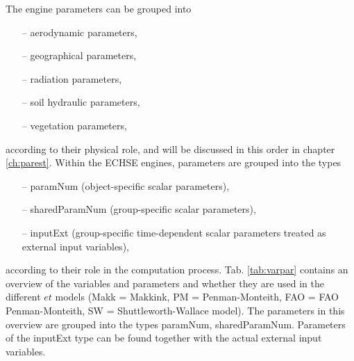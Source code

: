 \documentclass{scrreprt}
\begin{document}
The engine parameters can be grouped into
\begin{itemize}
  \item[--] aerodynamic parameters,
  \item[--] geographical parameters,
  \item[--] radiation parameters,
  \item[--] soil hydraulic parameters,
  \item[--] vegetation parameters,
\end{itemize}
%
according to their physical role, and will be discussed in this order in chapter \ref{ch:parest}.
Within the ECHSE engines, parameters are grouped into the types
\begin{itemize}
  \item[--] \textsf{paramNum} (object-specific scalar parameters),
  \item[--] \textsf{sharedParamNum} (group-specific scalar parameters),
  \item[--] \textsf{inputExt} (group-specific time-dependent scalar parameters treated as external input variables),
\end{itemize}
%
according to their role in the computation process.
Tab. \ref{tab:varpar} contains an overview of the variables and parameters and whether they are used in the different $et$ models (Makk = Makkink, PM = Penman-Monteith, FAO = FAO Penman-Monteith, SW = Shuttleworth-Wallace model).
The parameters in this overview are grouped into the types \textsf{paramNum}, \textsf{sharedParamNum}.
Parameters of the \textsf{inputExt} type can be found together with the actual external input variables.
\end{document}
